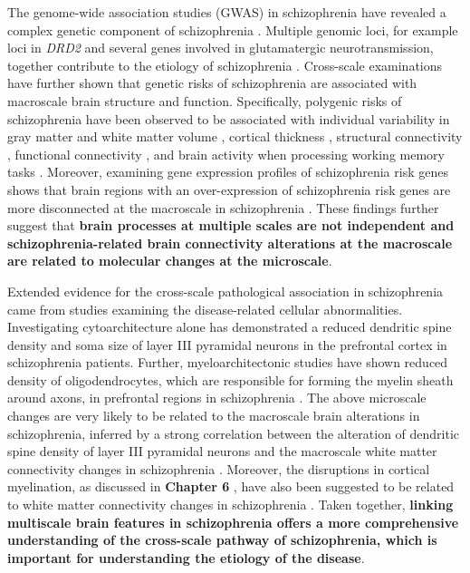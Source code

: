 \begin{refsection}
The genome-wide association studies (GWAS) in schizophrenia have revealed a complex genetic component of schizophrenia \citep{Ripke2014BiologicalIF,Li2017GenomewideAA}. Multiple genomic loci, for example loci in \textit{DRD2} and several genes involved in glutamatergic neurotransmission, together contribute to the etiology of schizophrenia \citep{Ripke2014BiologicalIF}. Cross-scale examinations have further shown that genetic risks of schizophrenia are associated with macroscale brain structure and function. Specifically, polygenic risks of schizophrenia have been observed to be associated with individual variability in gray matter and white matter volume \citep{Scheltinga2013GeneticSR}, cortical thickness \citep{Alns2019BrainHI}, structural connectivity \citep{Alloza2018PolygenicRS}, functional connectivity \citep{Wang2017PolygenicRF}, and brain activity when processing working memory tasks \citep{Kauppi2015PolygenicRF}. Moreover, examining gene expression profiles of schizophrenia risk genes shows that brain regions with an over-expression of schizophrenia risk genes are more disconnected at the macroscale in schizophrenia \citep{Romme2017ConnectomeDA}. These findings further suggest that \textbf{brain processes at multiple scales are not independent and schizophrenia-related brain connectivity alterations at the macroscale are related to molecular changes at the microscale}.

Extended evidence for the cross-scale pathological association in schizophrenia came from studies examining the disease-related cellular abnormalities. Investigating cytoarchitecture alone has demonstrated a reduced dendritic spine density \citep{Garey1998ReducedDS,Glantz2000DecreasedDS,Kolluri2005LaminaspecificRI} and soma size \citep{Pierri2001DecreasedSS} of layer III pyramidal neurons in the prefrontal cortex in schizophrenia patients. Further, myeloarchitectonic studies have shown reduced density of oligodendrocytes, which are responsible for forming the myelin sheath around axons, in prefrontal regions in schizophrenia \citep{Uranova2011UltrastructuralAO,Uranova2004OligodendroglialDI}. The above microscale changes are very likely to be related to the macroscale brain alterations in schizophrenia, inferred by a strong correlation between the alteration of dendritic spine density of layer III pyramidal neurons and the macroscale white matter connectivity changes in schizophrenia \citep{VANDENHEUVEL2016293}. Moreover, the disruptions in cortical myelination, as discussed in \textbf{Chapter 6} \citep{Wei2018CorticalMT}, have also been suggested to be related to white matter connectivity changes in schizophrenia \citep{Cassoli2015DisturbedMI}. Taken together, \textbf{linking multiscale brain features in schizophrenia offers a more comprehensive understanding of the cross-scale pathway of schizophrenia, which is important for understanding the etiology of the disease}.


\end{refsection}
